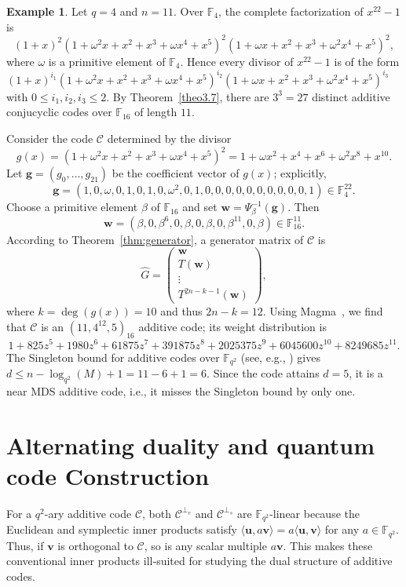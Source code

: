 \documentclass{aims}
\numberwithin{equation}{section}
\theoremstyle{definition}
\newtheorem{example}[theorem]{Example}
\newcommand{\F}{\mathbb{F}}
\begin{document}
\begin{example}\label{exam111}
	Let \(q = 4\) and \(n = 11\). Over \(\F_4\), the complete factorization of \(x^{22}-1\) is
	\[
	(1+x)^2 (1+\omega^2 x + x^2 + x^3 +\omega x^4 + x^5)^2 (1+\omega x + x^2 + x^3 +\omega^2 x^4 + x^5)^2,
	\]
	where \(\omega\) is a primitive element of \(\F_4\). Hence every divisor of \(x^{22}-1\) is of the form \((1+x)^{i_1}(1+\omega^2 x + x^2 + x^3 +\omega x^4 + x^5)^{i_2}(1+\omega x + x^2 + x^3 +\omega^2 x^4 + x^5)^{i_3}\) with \(0\le i_1,i_2,i_3\le 2\). By Theorem~\ref{theo3.7}, there are \(3^3 = 27\) distinct additive conjucyclic codes over \(\F_{16}\) of length \(11\).
	
	Consider the code \(\mathcal{C}\) determined by the divisor
	\[
	g(x) = (1+\omega^2 x + x^2 + x^3 +\omega x^4 + x^5)^2 = 1+\omega x^2 + x^4 + x^6 +\omega^2 x^8 + x^{10}.
	\]
	Let \(\pmb{g} = (g_0,\dots,g_{21})\) be the coefficient vector of \(g(x)\); explicitly,
	\[
	\pmb{g} = (1,0,\omega,0,1,0,1,0,\omega^2,0,1,0,0,0,0,0,0,0,0,0,0,1)\in\F_4^{22}.
	\]
	Choose a primitive element \(\beta\) of \(\F_{16}\) and set \(\mathbf{w} = \Psi_\beta^{-1}(\pmb{g})\). Then
	\[
	\mathbf{w} = (\beta,0,\beta^{6},0,\beta,0,\beta,0,\beta^{11},0,\beta)\in\F_{16}^{11}.
	\]
	According to Theorem~\ref{thm:generator}, a generator matrix of \(\mathcal{C}\) is
	\[
	\hat{G} = \begin{pmatrix}
		\mathbf{w} \\
		T(\mathbf{w}) \\
		\vdots \\
		T^{2n-k-1}(\mathbf{w})
	\end{pmatrix},
	\]
	where \(k = \deg(g(x)) = 10\) and thus \(2n-k = 12\). Using Magma~\cite{bosma1997}, we find that \(\mathcal{C}\) is an \((11,4^{12},5)_{16}\) additive code; its weight distribution is
	\[
	1 + 825z^{5} + 1980z^{6} + 61875z^{7} + 391875z^{8} + 2025375z^{9} + 6045600z^{10} + 8249685z^{11}.
	\]
	The Singleton bound for additive codes over \(\F_{q^2}\) (see, e.g., \cite{huffman2003}) gives \(d \le n - \log_{q^2}(M) + 1 = 11 - 6 + 1 = 6\). Since the code attains \(d = 5\), it is a near MDS additive code, i.e., it misses the Singleton bound by only one.
\end{example}


\section{Alternating duality and quantum code Construction}\label{sec:generator}

For a $q^2$-ary additive code $\mathcal{C}$, both $\mathcal{C}^{\perp_e}$ and $\mathcal{C}^{\perp_s}$ are $\F_{q^2}$-linear because the Euclidean and symplectic inner products satisfy $\langle \mathbf{u}, a\mathbf{v} \rangle = a \langle \mathbf{u}, \mathbf{v} \rangle$ for any $a \in \F_{q^2}$. Thus, if $\mathbf{v}$ is orthogonal to $\mathcal{C}$, so is any scalar multiple $a\mathbf{v}$. This makes these conventional inner products ill‑suited for studying the dual structure of additive codes.
\end{document}

